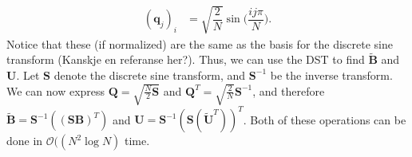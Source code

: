 \begin{align*}
	(\mathbf{q}_j)_i &= \sqrt{\dfrac{2}{N}}\sin \Big( \dfrac{ij\pi}{N}\Big).
\end{align*}
Notice that these (if normalized) are the same as the basis for the discrete sine transform (Kanskje en referanse her?). Thus, we can use the DST to find $\mathbf{\widetilde{B}}$ and $\mathbf{U}$. Let $\mathbf{S}$ denote the discrete sine transform, and $\mathbf{S}^{-1}$ be the inverse transform. We can now express $\mathbf{Q} = \sqrt{\frac{N}{2}\mathbf{S}}$ and $\mathbf{Q}^T = \sqrt{\frac{2}{N}}\mathbf{S}^{-1}$, and therefore $\mathbf{\widetilde{B}} = \mathbf{S}^{-1}((\mathbf{SB})^T)$ and $\mathbf{U} = \mathbf{S}^{-1}(\mathbf{S}(\mathbf{\widetilde{U}}^T))^T$. Both of these operations can be done in $\mathcal{O}((N^2\log{N})$ time. 